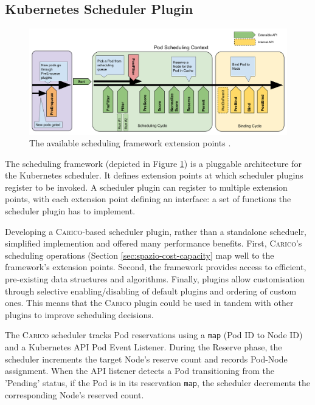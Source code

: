 \subsection{Kubernetes Scheduler Plugin}
\begin{figure}[H]
    \centering
    \includegraphics[width=\textwidth]{images/scheduling-framework-extensions.png}
    \caption{The available scheduling framework extension points
    \cite{scheduling-framework}.}
    \label{fig:kube-sched-framework}
\end{figure}
The scheduling framework (depicted in Figure \ref{fig:kube-sched-framework}) is
a pluggable architecture for the Kubernetes scheduler. It defines extension
points at which scheduler plugins register to be invoked. A scheduler plugin can
register to multiple extension points, with each extension point defining an
interface: a set of functions the scheduler plugin has to implement.

Developing a \textsc{Carico}-based scheduler plugin, rather than a standalone
scheduelr, simplified implemention and offered many performance benefits. First,
\textsc{Carico}'s scheduling operations (Section \ref{sec:spazio-cost-capacity}
map well to the framework's extension points. Second, the framework provides
access to efficient, pre-existing data structures and algorithms. Finally,
plugins allow customisation through selective enabling/disabling of default
plugins and ordering of custom ones. This means that the \textsc{Carico} plugin
could be used in tandem with other plugins to improve scheduling decisions.

The \textsc{Carico} scheduler tracks Pod reservations using a \verb|map| (Pod ID
to Node ID) and a Kubernetes API Pod Event Listener. During the Reserve phase, the scheduler
increments the target Node's reserve count and records Pod-Node assignment. When
the API listener detects a Pod transitioning from the 'Pending'
status, if the Pod is in its reservation \verb|map|, the scheduler decrements
the corresponding Node's reserved count.
